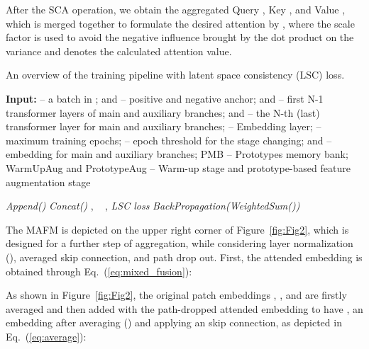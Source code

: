 \documentclass[lettersize,journal]{IEEEtran}
\begin{document}
After the SCA operation, we obtain the aggregated Query , Key , and Value , which is merged together to formulate the desired attention by , where the scale factor is used to avoid the negative influence brought by the dot product on the variance and  denotes the calculated attention value.
\setlength{\textfloatsep}{5pt}
\begin{algorithm}[t]
    \caption{An overview of the training pipeline with latent space consistency (LSC) loss.}
    \label{algorithm1}
    \renewcommand{\thealgorithm}{}
  
    \begin{algorithmic}[1]
        \small{
            \STATEx \textbf{Input:}   -- a batch in ;  and  -- positive and negative anchor;   and  --  first N-1 transformer layers of main and auxiliary branches;  and  -- the N-th (last) transformer layer for main and auxiliary branches;  -- Embedding layer;  -- maximum training epochs;  -- epoch threshold for the stage changing;  and  -- embedding for main and auxiliary branches; PMB -- Prototypes memory bank; WarmUpAug and PrototypeAug -- Warm-up stage and prototype-based feature augmentation stage
            
        }
        \FORALL{}
        \FORALL{}
                \IF {\textit{}} 
                \textit{Append()}  \textit{}
                \ENDFOR
                \STATE \textit{ Concat()}
                \ENDIF
          \ENDIF
        \STATE 
        \STATE , 
        \IF {\textit{}}  \ELSE~ {} \ENDIF
        \STATE , 
        \STATE 
        \STATE  \textit{LSC loss}
        \STATE 
        \STATE \textit{BackPropagation(WeightedSum())}
        \ENDFOR
        \IF {\textit{}} 
        \STATE 
        \ENDIF
        \ENDFOR
    \end{algorithmic}
\end{algorithm}

The MAFM is depicted on the upper right corner of Figure~\ref{fig:Fig2}, which is designed for a further step of aggregation, while considering layer normalization (), averaged skip connection, and path drop out. First, the attended embedding  is obtained through Eq.~(\ref{eq:mixed_fusion}):

As shown in Figure~\ref{fig:Fig2}, the original patch embeddings , , and  are firstly averaged and then added with the path-dropped attended embedding  to have , an embedding after averaging () and applying an skip connection, as depicted in Eq.~(\ref{eq:average}):
\end{document}

